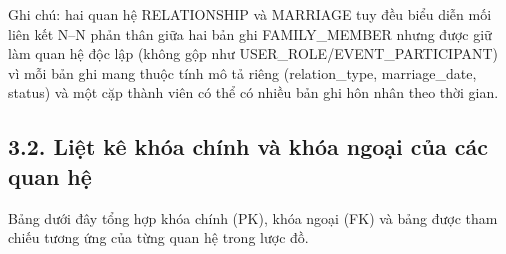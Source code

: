 Ghi chú: hai quan hệ RELATIONSHIP và MARRIAGE tuy đều biểu diễn mối liên kết N--N phản thân giữa hai bản ghi FAMILY\_MEMBER nhưng được giữ làm quan hệ độc lập (không gộp như USER\_ROLE/EVENT\_PARTICIPANT) vì mỗi bản ghi mang thuộc tính mô tả riêng (relation\_type, marriage\_date, status) và một cặp thành viên có thể có nhiều bản ghi hôn nhân theo thời gian.

\subsection{3.2. Liệt kê khóa chính và khóa ngoại của các quan hệ}
\label{sec:khoa_chinh_khoa_ngoai}

Bảng dưới đây tổng hợp khóa chính (PK), khóa ngoại (FK) và bảng được tham chiếu tương ứng của từng quan hệ trong lược đồ.

\renewcommand{\arraystretch}{1.3}
\setlength{\tabcolsep}{3pt}

